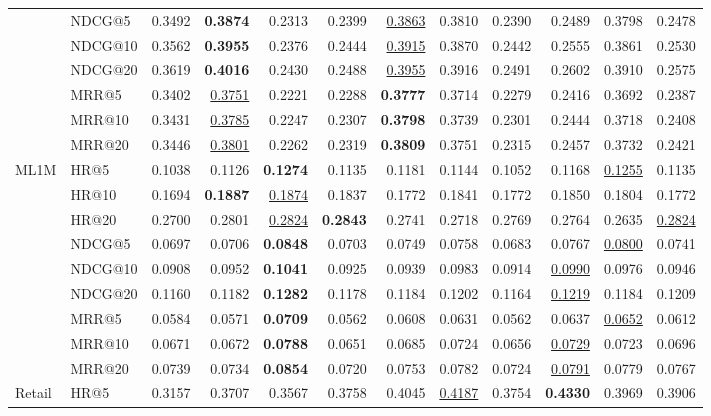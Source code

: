 \begin{tabular}{llrrrrrrrrrr}
 & NDCG@5 & 0.3492 & \textbf{0.3874} & 0.2313 & 0.2399 & \underline{0.3863} & 0.3810 & 0.2390 & 0.2489 & 0.3798 & 0.2478 \\
 & NDCG@10 & 0.3562 & \textbf{0.3955} & 0.2376 & 0.2444 & \underline{0.3915} & 0.3870 & 0.2442 & 0.2555 & 0.3861 & 0.2530 \\
 & NDCG@20 & 0.3619 & \textbf{0.4016} & 0.2430 & 0.2488 & \underline{0.3955} & 0.3916 & 0.2491 & 0.2602 & 0.3910 & 0.2575 \\
 & MRR@5 & 0.3402 & \underline{0.3751} & 0.2221 & 0.2288 & \textbf{0.3777} & 0.3714 & 0.2279 & 0.2416 & 0.3692 & 0.2387 \\
 & MRR@10 & 0.3431 & \underline{0.3785} & 0.2247 & 0.2307 & \textbf{0.3798} & 0.3739 & 0.2301 & 0.2444 & 0.3718 & 0.2408 \\
 & MRR@20 & 0.3446 & \underline{0.3801} & 0.2262 & 0.2319 & \textbf{0.3809} & 0.3751 & 0.2315 & 0.2457 & 0.3732 & 0.2421 \\
\hline
ML1M & HR@5 & 0.1038 & 0.1126 & \textbf{0.1274} & 0.1135 & 0.1181 & 0.1144 & 0.1052 & 0.1168 & \underline{0.1255} & 0.1135 \\
 & HR@10 & 0.1694 & \textbf{0.1887} & \underline{0.1874} & 0.1837 & 0.1772 & 0.1841 & 0.1772 & 0.1850 & 0.1804 & 0.1772 \\
 & HR@20 & 0.2700 & 0.2801 & \underline{0.2824} & \textbf{0.2843} & 0.2741 & 0.2718 & 0.2769 & 0.2764 & 0.2635 & \underline{0.2824} \\
 & NDCG@5 & 0.0697 & 0.0706 & \textbf{0.0848} & 0.0703 & 0.0749 & 0.0758 & 0.0683 & 0.0767 & \underline{0.0800} & 0.0741 \\
 & NDCG@10 & 0.0908 & 0.0952 & \textbf{0.1041} & 0.0925 & 0.0939 & 0.0983 & 0.0914 & \underline{0.0990} & 0.0976 & 0.0946 \\
 & NDCG@20 & 0.1160 & 0.1182 & \textbf{0.1282} & 0.1178 & 0.1184 & 0.1202 & 0.1164 & \underline{0.1219} & 0.1184 & 0.1209 \\
 & MRR@5 & 0.0584 & 0.0571 & \textbf{0.0709} & 0.0562 & 0.0608 & 0.0631 & 0.0562 & 0.0637 & \underline{0.0652} & 0.0612 \\
 & MRR@10 & 0.0671 & 0.0672 & \textbf{0.0788} & 0.0651 & 0.0685 & 0.0724 & 0.0656 & \underline{0.0729} & 0.0723 & 0.0696 \\
 & MRR@20 & 0.0739 & 0.0734 & \textbf{0.0854} & 0.0720 & 0.0753 & 0.0782 & 0.0724 & \underline{0.0791} & 0.0779 & 0.0767 \\
\hline
Retail & HR@5 & 0.3157 & 0.3707 & 0.3567 & 0.3758 & 0.4045 & \underline{0.4187} & 0.3754 & \textbf{0.4330} & 0.3969 & 0.3906 \\

\end{tabular}
